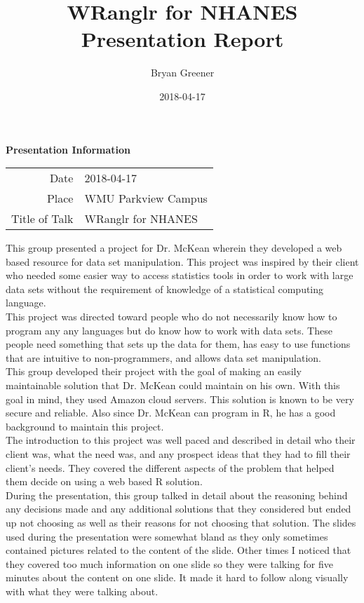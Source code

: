 \documentclass[12pt]{article}
\title{\huge WRanglr for NHANES\\
	\LARGE Presentation Report}
\author{Bryan Greener}
\date{2018-04-17}
\begin{document}
\maketitle

\TabPositions{4cm}
\begin{center}
\textbf{Presentation Information}\\
\begin{tabular}{rl}
Date & 2018-04-17\\
Place & WMU Parkview Campus\\
Title of Talk & WRanglr for NHANES\\
\end{tabular}
\end{center}

This group presented a project for Dr. McKean wherein they developed a web based resource for data set manipulation. This project was inspired by their client who needed some easier way to access statistics tools in order to work with large data sets without the requirement of knowledge of a statistical computing language.\\

This project was directed toward people who do not necessarily know how to program any any languages but do know how to work with data sets. These people need something that sets up the data for them, has easy to use functions that are intuitive to non-programmers, and allows data set manipulation.\\

This group developed their project with the goal of making an easily maintainable solution that Dr. McKean could maintain on his own. With this goal in mind, they used Amazon cloud servers. This solution is known to be very secure and reliable. Also since Dr. McKean can program in R, he has a good background to maintain this project.\\

The introduction to this project was well paced and described in detail who their client was, what the need was, and any prospect ideas that they had to fill their client's needs. They covered the different aspects of the problem that helped them decide on using a web based R solution.\\

During the presentation, this group talked in detail about the reasoning behind any decisions made and any additional solutions that they considered but ended up not choosing as well as their reasons for not choosing that solution. The slides used during the presentation were somewhat bland as they only sometimes contained pictures related to the content of the slide. Other times I noticed that they covered too much information on one slide so they were talking for five minutes about the content on one slide. It made it hard to follow along visually with what they were talking about.\\
\end{document}
